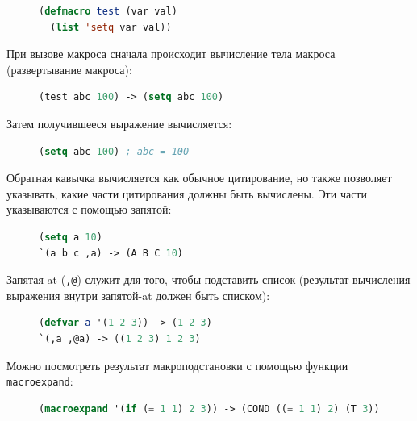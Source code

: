 \begin{figure}[H]
\begin{lstlisting}[language=Lisp]
(defmacro test (var val)
  (list 'setq var val))
\end{lstlisting}
\end{figure}

При вызове макроса сначала происходит вычисление тела макроса (развертывание макроса):

\begin{figure}[H]
\begin{lstlisting}[language=Lisp]
(test abc 100) -> (setq abc 100)
\end{lstlisting}
\end{figure}

Затем получившееся выражение вычисляется:

\begin{figure}[H]
\begin{lstlisting}[language=Lisp]
(setq abc 100) ; abc = 100
\end{lstlisting}
\end{figure}

Обратная кавычка вычисляется как обычное цитирование, но также позволяет указывать, какие части цитирования должны быть вычислены. Эти части указываются с помощью запятой:

\begin{figure}[H]
\begin{lstlisting}[language=Lisp]
(setq a 10)
`(a b c ,a) -> (A B C 10)
\end{lstlisting}
\end{figure}

Запятая-at (\texttt{,@}) служит для того, чтобы подставить список (результат вычисления выражения внутри запятой-at должен быть списком):

\begin{figure}[H]
\begin{lstlisting}[language=Lisp]
(defvar a '(1 2 3)) -> (1 2 3)
`(,a ,@a) -> ((1 2 3) 1 2 3)
\end{lstlisting}
\end{figure}

Можно посмотреть результат макроподстановки с помощью функции \texttt{macroexpand}:

\begin{figure}[H]
\begin{lstlisting}[language=Lisp]
(macroexpand '(if (= 1 1) 2 3)) -> (COND ((= 1 1) 2) (T 3))
\end{lstlisting}
\end{figure}

